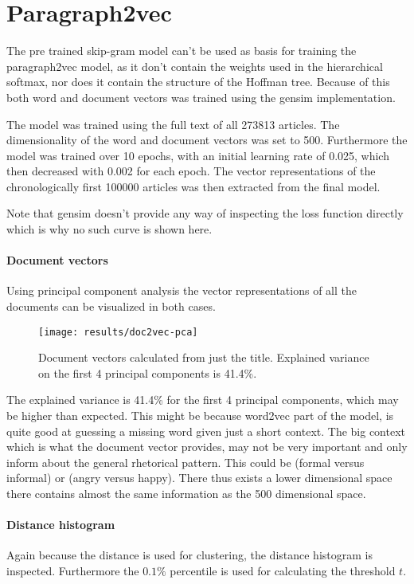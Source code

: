 \section{Paragraph2vec}

The pre trained skip-gram model can't be used as basis for training the paragraph2vec model, as it don't contain the weights used in the hierarchical softmax, nor does it contain the structure of the Hoffman tree. Because of this both word and document vectors was trained using the gensim implementation.

The model was trained using the full text of all 273813 articles. The dimensionality of the word and document vectors was set to 500. Furthermore the model was trained over 10 epochs, with an initial learning rate of 0.025, which then decreased with 0.002 for each epoch. The vector representations of the chronologically first 100000 articles was then extracted from the final model.

Note that gensim doesn't provide any way of inspecting the loss function directly which is why no such curve is shown here.

\paragraph{Document vectors} Using principal component analysis the vector representations of all the documents can be visualized in both cases.

\begin{figure}[H]
	\centering
	\texttt{[image: results/doc2vec-pca]}
	\caption{Document vectors calculated from just the title. Explained variance on the first 4 principal components is 41.4\%.}
\end{figure}

The explained variance is 41.4\% for the first 4 principal components, which may be higher than expected. This might be because word2vec part of the model, is quite good at guessing a missing word given just a short context. The big context which is what the document vector provides, may not be very important and only inform about the general rhetorical pattern. This could be (formal versus informal) or (angry versus happy). There thus exists a lower dimensional space there contains almost the same information as the 500 dimensional space.

\paragraph{Distance histogram} Again because the distance is used for clustering, the distance histogram is inspected. Furthermore the $0.1\%$ percentile is used for calculating the threshold $t$.

